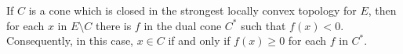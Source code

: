 If $C$ is a cone which is closed in the strongest locally convex topology for $E$, then for each $x$ in $E \setminus C$ there is $f$ in the dual cone $C^{*}$ such that $f(x) < 0$. Consequently, in this case, $x \in C$ if and only if $f(x) \geq 0$ for each $f$ in $C^{*}$.
